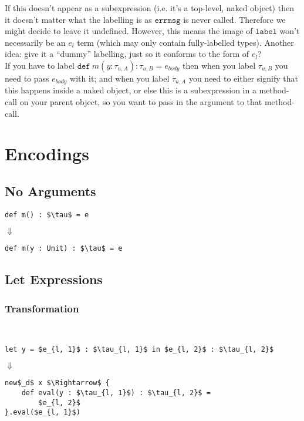\documentclass{llncs}
\newcommand{\keywadj}[1]{\mathtt{#1}}
\newcommand{\kwa}[1]{\keywadj{ #1 }}
\begin{document}
\noindent
If this doesn't appear as a subexpression (i.e. it's a top-level, naked object) then it doesn't matter what the labelling is as $\kwa{errmsg}$ is never called. Therefore we might decide to leave it undefined. However, this means the image of $\kwa{label}$ won't necessarily be an $e_l$ term (which may only contain fully-labelled types). Another idea: give it a ``dummy'' labelling, just so it conforms to the form of $e_l$? \\

\noindent
If you have to label $\kwa{def}~m(y : \tau_{u, A}) : \tau_{u, B} = e_{body}$ then when you label $\tau_{u, B}$ you need to pass $e_{body}$ with it; and when you label $\tau_{u, A}$ you need to either signify that this happens inside a naked object, or else this is a subexpression in a method-call on your parent object, so you want to pass in the argument to that method-call.\\

\section{Encodings}

\subsection{No Arguments}

\begin{lstlisting}
def m() : $\tau$ = e
\end{lstlisting}

$\Downarrow$

\begin{lstlisting}
def m(y : Unit) : $\tau$ = e
\end{lstlisting}

\subsection{Let Expressions}

\subsubsection*{Transformation}
~
\begin{lstlisting}
let y = $e_{l, 1}$ : $\tau_{l, 1}$ in $e_{l, 2}$ : $\tau_{l, 2}$
\end{lstlisting}

$\Downarrow$

\begin{lstlisting}
new$_d$ x $\Rightarrow$ {
    def eval(y : $\tau_{l, 1}$) : $\tau_{l, 2}$ =
        $e_{l, 2}$
}.eval($e_{l, 1}$)
\end{lstlisting}
\end{document}
